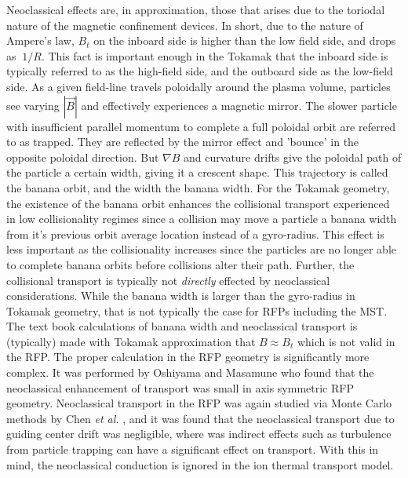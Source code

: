 \begin{refsection}
Neoclassical effects are, in approximation, those that arises due to the toriodal nature of the magnetic confinement devices. In short, due to the nature of Ampere's law, $B_t$ on the inboard side is higher than the low field side, and drops as $~1/R$. This fact is important enough in the Tokamak that the inboard side is typically referred to as the high-field side, and the outboard side as the low-field side. As a given field-line travels poloidally around the plasma volume, particles see varying $|\vec{B}|$ and effectively experiences a magnetic mirror. The slower particle with insufficient parallel momentum to complete a full poloidal orbit are referred to as trapped. They are reflected by the mirror effect and 'bounce' in the opposite poloidal direction. But $\nabla B$ and curvature drifts give the poloidal path of the particle a certain width, giving it a crescent shape. This trajectory is called the banana orbit, and the width the banana width. For the Tokamak geometry, the existence of the banana orbit enhances the collisional transport experienced in low collisionality regimes since a collision may move a particle a banana width from it's previous orbit average location instead of a gyro-radius. This effect is less important as the collisionality increases since the particles are no longer able to complete banana orbits before collisions alter their path. Further, the collisional transport is typically not \emph{directly} effected by neoclassical considerations. While the banana width is larger than the gyro-radius in Tokamak geometry, that is not typically the case for RFPs including the MST. The text book calculations of banana width and neoclassical transport is (typically) made with Tokamak approximation that $B \approx B_t$ which is not valid in the RFP. The proper calculation in the RFP geometry is significantly more complex. It was performed by Oshiyama and Masamune \cite{Oshiyama1983} who found that the neoclassical enhancement of transport was small in axis symmetric RFP geometry. Neoclassical transport in the RFP was again studied via Monte Carlo methods by Chen \textit{et al.} \cite{Chen1992}, and it was found that the neoclassical transport due to guiding center drift was negligible, where was indirect effects such as turbulence from particle trapping can have a significant effect on transport. With this in mind, the neoclassical conduction is ignored in the ion thermal transport model.


\end{refsection}
